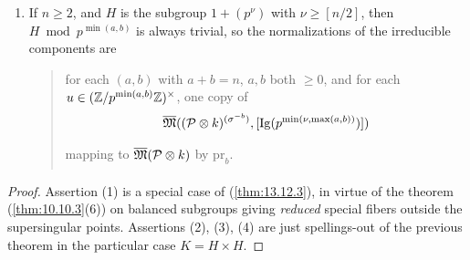 \begin{kcor}
\begin{enumerate}[(1)]
\begin{itemize}[leftmargin=2.5em]
\item[$(0,1)$~:] $\overline{\mathfrak{M}}((\mathcal{P} \tens{} k)^{(\sigma^{-1})}, [\mathrm{Ig}(p)])/H$ mapping by $\mathrm{pr}_1$ to $\overline{\mathfrak{M}}(\mathcal{P} \tens{} k)$.
\end{itemize}
\item If $n \ge 2$, and $H$ is the subgroup $1 + (p^\nu)$ with $\nu \ge [n/2]$, then $H \bmod p^{\min(a,b)}$ is always trivial, so the normalizations of the irreducible components are
\begin{quote}
for each $(a,b)$ with $a+b = n$, $a,b$ both $\ge 0$, and for each $u \in (\mathbb{Z}/p^{\min(a,b)}\mathbb{Z})^\times$, one copy of
\[
\overline{\mathfrak{M}}((\mathcal{P} \underset{}{\otimes} k)^{(\sigma^{-b})}, [\mathrm{Ig}(p^{\min(\nu, \max(a,b))})])
\]
mapping to $\overline{\mathfrak{M}}(\mathcal{P} \tens{} k)$ by $\mathrm{pr}_b$.
\end{quote}
\end{enumerate}
\end{kcor}

\begin{proof}
Assertion (1) is a special case of (\ref{thm:13.12.3}), in virtue of the theorem (\ref{thm:10.10.3}(6)) on balanced subgroups giving \emph{reduced} special fibers outside the supersingular points. Assertions (2), (3), (4) are just spellings-out of the previous theorem in the particular case $K = H \times H$.
\end{proof}
